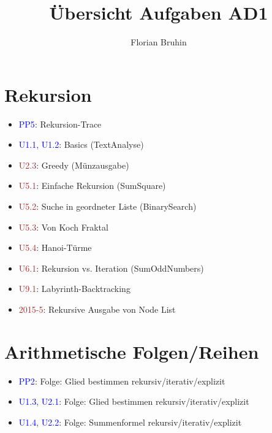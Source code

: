 \documentclass[a4paper]{article}
\newcommand{\ub}[1]{\textcolor{blue}{#1}}
\newcommand{\ubc}[1]{\textcolor{brown}{#1}}
\begin{document}
\title{Übersicht Aufgaben AD1}
\author{Florian Bruhin}
\maketitle

\section{Rekursion}

\begin{itemize}
  \item \ub{PP5}: Rekursion-Trace
  \item \ub{U1.1, U1.2}: Basics (TextAnalyse)
  \item \ubc{U2.3}: Greedy (Münzausgabe)
  \item \ubc{U5.1}: Einfache Rekursion (SumSquare)
  \item \ubc{U5.2}: Suche in geordneter Liste (BinarySearch)
  \item \ubc{U5.3}: Von Koch Fraktal
  \item \ubc{U5.4}: Hanoi-Türme
  \item \ubc{U6.1}: Rekursion vs. Iteration (SumOddNumbers)
  \item \ubc{U9.1}: Labyrinth-Backtracking
  \item \ubc{2015-5}: Rekursive Ausgabe von Node List
\end{itemize}

\section{Arithmetische Folgen/Reihen}
\begin{itemize}
  \item \ub{PP2}: Folge: Glied bestimmen rekursiv/iterativ/explizit
  \item \ub{U1.3, U2.1}: Folge: Glied bestimmen rekursiv/iterativ/explizit
  \item \ub{U1.4, U2.2}: Folge: Summenformel rekursiv/iterativ/explizit
\end{itemize}

\pagebreak
\end{document}
